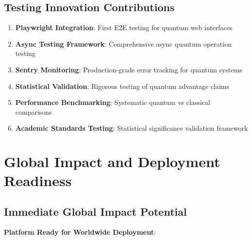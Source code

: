 \documentclass[12pt,a4paper]{article}
\begin{document}
\subsection{Testing Innovation Contributions}

\begin{enumerate}
    \item \textbf{Playwright Integration}: First E2E testing for quantum web interfaces
    \item \textbf{Async Testing Framework}: Comprehensive async quantum operation testing
    \item \textbf{Sentry Monitoring}: Production-grade error tracking for quantum systems
    \item \textbf{Statistical Validation}: Rigorous testing of quantum advantage claims
    \item \textbf{Performance Benchmarking}: Systematic quantum vs classical comparisons
    \item \textbf{Academic Standards Testing}: Statistical significance validation framework
\end{enumerate}

\section{Global Impact and Deployment Readiness}

\subsection{Immediate Global Impact Potential}

\textbf{Platform Ready for Worldwide Deployment}:
\end{document}
